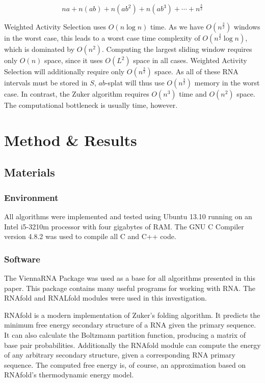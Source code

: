 \documentclass{cshonours}
\begin{document}
\begin{equation} \label{eq:intervalsone}
	n a + n(a b) + n(a b^2) + n(a b^3) + \cdots + n^\frac{3}{2}
\end{equation}

Weighted Activity Selection uses $O(n \log n)$ time. As we have $O(n^\frac{3}{2})$ windows in the worst case, this leads to a worst case time complexity of $O(n^\frac{3}{2} \log n)$, which is dominated by $O(n^2)$. Computing the largest sliding window requires only $O(n)$ space, since it uses $O(L^2)$ space in all cases. Weighted Activity Selection will additionally require only $O(n^\frac{3}{2})$ space. As all of these RNA intervals must be stored in $S$, $ab$-splat will thus use $O(n^\frac{3}{2})$ memory in the worst case. In contrast, the Zuker algorithm requires $O(n^3)$ time and $O(n^2)$ space. The computational bottleneck is usually time, however. 


\chapter{Method \& Results}



\section{Materials}
\subsection{Environment}
All algorithms were implemented and tested using Ubuntu 13.10 running on an Intel i5-3210m processor with four gigabytes of RAM. The GNU C Compiler version 4.8.2 was used to compile all C and C++ code. 

\subsection{Software}
The ViennaRNA Package \cite{lorenz2011viennarna} was used as a base for all algorithms presented in this paper. This package contains many useful programs for working with RNA. The RNAfold and RNALfold modules were used in this investigation. 

RNAfold is a modern implementation of Zuker's folding algorithm. It predicts the minimum free energy secondary structure of a RNA given the primary sequence. It can also calculate the Boltzmann partition function, producing a matrix of base pair probabilities. Additionally the RNAfold module can compute the energy of any arbitrary secondary structure, given a corresponding RNA primary sequence. The computed free energy is, of course, an approximation based on RNAfold's thermodynamic energy model.
\end{document}
